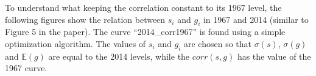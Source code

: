 \documentclass{article}
\begin{document}
To understand what keeping the correlation constant to its 1967 level, the following figures show the relation between $s_i$ and $g_i$ in 1967 and 2014 (similar to Figure 5 in the paper). The curve ``2014\_corr1967'' is found using a simple optimization algorithm. The values of $s_i$ and $g_i$ are chosen so that $\sigma(s)$, $\sigma(g)$ and $\mathbb{E}(g)$ are equal to the 2014 levels, while the $corr(s,g)$ has the value of the 1967 curve.
\begin{figure}[H]
  \centering
  \vfill
  \caption*{}
  \vfill
  \caption*{}
\end{figure}
\end{document}
